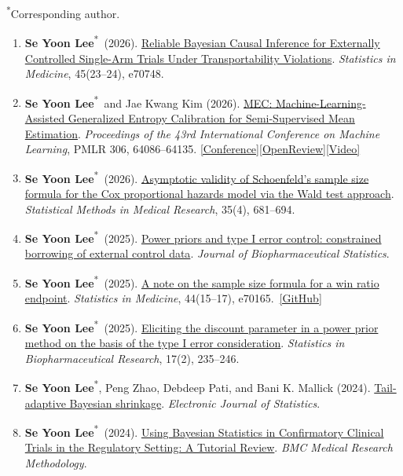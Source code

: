 \documentclass[11pt,letterpaper]{article}
\newcommand{\cvsection}[1]{\par\addvspace{10pt}\Needspace{4\baselineskip}{\color{accent}\large\bfseries #1}\par\vspace{3pt}{\color{accent}\hrule height 0.45pt}\vspace{6pt}}
\newcommand{\me}{\textbf{Se Yoon Lee}}
\newcommand{\corr}{\textsuperscript{*}}
\begin{document}
\cvsection{Peer-Reviewed Publications}
\textsuperscript{*}Corresponding author.
\begin{enumerate}
\item \me\corr\ (2026). \href{https://doi.org/10.1002/sim.70748}{Reliable Bayesian Causal Inference for Externally Controlled Single-Arm Trials Under Transportability Violations}. \textit{Statistics in Medicine}, 45(23--24), e70748.
\item \me\corr\ and Jae Kwang Kim (2026). \href{https://proceedings.mlr.press/v306/lee26z.html}{MEC: Machine-Learning-Assisted Generalized Entropy Calibration for Semi-Supervised Mean Estimation}. \textit{Proceedings of the 43rd International Conference on Machine Learning}, PMLR 306, 64086--64135.
\href{https://icml.cc/virtual/2026/poster/62031}{[Conference]}\enspace\href{https://openreview.net/forum?id=kWxN36TDN8}{[OpenReview]}\enspace\href{https://recorder-v3.slideslive.com/#/share?share=110691&s=5f718684-cf55-4c25-a8f8-42cf80b85829}{[Video]}
\item \me\corr\ (2026). \href{https://doi.org/10.1177/09622802261427024}{Asymptotic validity of Schoenfeld's sample size formula for the Cox proportional hazards model via the Wald test approach}. \textit{Statistical Methods in Medical Research}, 35(4), 681--694.
\item \me\corr\ (2025). \href{https://doi.org/10.1080/10543406.2025.2575940}{Power priors and type I error control: constrained borrowing of external control data}. \textit{Journal of Biopharmaceutical Statistics}.
\item \me\corr\ (2025). \href{https://doi.org/10.1002/sim.70165}{A note on the sample size formula for a win ratio endpoint}. \textit{Statistics in Medicine}, 44(15--17), e70165.~\href{https://github.com/yain22/winratiosim}{[GitHub]}
\item \me\corr\ (2025). \href{https://doi.org/10.1080/19466315.2024.2368789}{Eliciting the discount parameter in a power prior method on the basis of the type I error consideration}. \textit{Statistics in Biopharmaceutical Research}, 17(2), 235--246.
\item \me\corr, Peng Zhao, Debdeep Pati, and Bani K. Mallick (2024). \href{https://doi.org/10.1214/24-EJS2317}{Tail-adaptive Bayesian shrinkage}. \textit{Electronic Journal of Statistics}.
\item \me\corr\ (2024). \href{https://doi.org/10.1186/s12874-024-02235-0}{Using Bayesian Statistics in Confirmatory Clinical Trials in the Regulatory Setting: A Tutorial Review}. \textit{BMC Medical Research Methodology}.

\end{enumerate}
\end{document}
